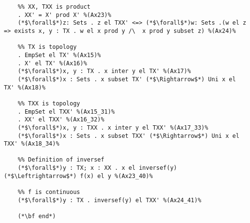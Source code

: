 \documentclass{standalone}
\begin{document}
\begin{lstlisting}
	%% XX, TXX is product
	. XX' = X' prod X' %(Ax23)%
	(*$\forall$*)z: Sets . z el TXX' <=> (*$\forall$*)w: Sets .(w el z => exists x, y : TX . w el x prod y /\  x prod y subset z) %(Ax24)%
	
	%% TX is topology
	. EmpSet el TX' %(Ax15)%
	. X' el TX' %(Ax16)%
	(*$\forall$*)x, y : TX . x inter y el TX' %(Ax17)%
	(*$\forall$*)x : Sets . x subset TX' (*$\Rightarrow$*) Uni x el TX' %(Ax18)%
	
	%% TXX is topology
	. EmpSet el TXX' %(Ax15_31)%
	. XX' el TXX' %(Ax16_32)%
	(*$\forall$*)x, y : TXX . x inter y el TXX' %(Ax17_33)%
	(*$\forall$*)x : Sets . x subset TXX' (*$\Rightarrow$*) Uni x el TXX' %(Ax18_34)%
	
	%% Definition of inversef
	(*$\forall$*)y : TX; x : XX . x el inversef(y) (*$\Leftrightarrow$*) f(x) el y %(Ax23_40)%
	
	%% f is continuous
	(*$\forall$*)y : TX . inversef(y) el TXX' %(Ax24_41)%
	
	(*\bf end*)
\end{lstlisting}
\end{document}
